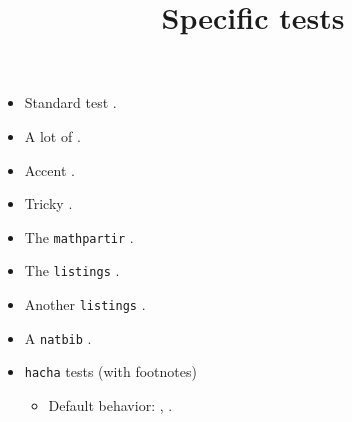 \documentclass{article}
\title{Specific tests}
\author{}
\date{}
\begin{document}
\maketitle
\begin{itemize}
\item Standard test .
\item A lot of .
\item Accent .
\item Tricky .
\item The \texttt{mathpartir} .
\item The \texttt{listings} .
\item Another \texttt{listings} .
\item A \texttt{natbib} .
\item \texttt{hacha} tests (with footnotes)
\begin{itemize}
\item Default behavior: ,
.
\end{itemize}
\end{itemize}
\end{document}

